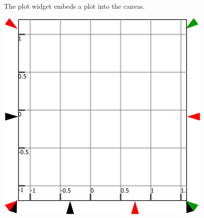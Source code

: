 The plot widget embeds a plot into the canvas.
\begin{center}
\includegraphics{images/Plot} 
\par\end{center}

